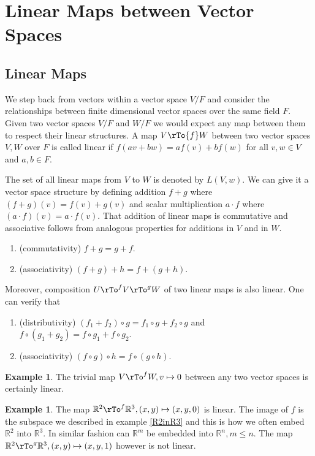 \documentclass[12pt]{amsart}
\theoremstyle{definition}
\newtheorem{example}[theorem]{Example}
\begin{document}
\section{Linear Maps between Vector Spaces}

\subsection {Linear Maps}\label{linearmapmatrix} We step back from vectors within a vector space $V/F$ and consider the relationships between finite dimensional vector spaces over the same field $F$. Given two vector spaces $V/F$ and $W/F$ we would expect any map between them to respect their linear structures.
\dfn A map $V \rTo{f} W$ between two vector spaces $V, W$ over $F$ is called linear if $f(a v + b w) = a f(v) + b f(w)$ for all $v, w \in V$ and $a, b \in F$.

The set of all linear maps from $V$ to $W$ is denoted by $L(V, w)$. We can give it a vector space structure by defining addition $f+g$ where $(f+g)(v) = f(v) + g(v)$ and scalar multiplication $a \cdot f$ where $(a \cdot f)(v) = a \cdot f(v)$. That addition of linear maps is commutative and associative follows from analogous properties for additions in $V$ and in $W$.
\begin{enumerate}[\indent 1.]
\item (commutativity) $f + g = g + f$.
\item (associativity) $(f + g) + h = f + (g + h)$.
\end{enumerate}

Moreover, composition $U \rTo^f V \rTo^g W$ of two linear maps is also linear. One can verify that
\begin{enumerate}[\indent 1.]
\item (distributivity) $(f_1 + f_2) \circ g = f_1 \circ g + f_2 \circ g$ and $f \circ (g_1 + g_2) = f \circ g_1 + f \circ g_2$.
\item (associativity) $(f \circ g) \circ h = f \circ (g \circ h)$.
\end{enumerate}

\begin{example} The trivial map $V \rTo^f W, v \mapsto 0$ between any two vector spaces is certainly linear.
\end{example}

\begin{example} The map $\mathbb{R}^2 \rTo^f \mathbb{R}^3, (x, y) \mapsto (x, y,0)$ is linear. The image of $f$ is the subspace we described in example \ref{R2inR3} and this is how we often embed $\mathbb{R}^2$ into $\mathbb{R}^3$. In similar fashion can $\mathbb{R}^m$ be embedded into $\mathbb{R}^n, m \leq n$. The map $\mathbb{R}^2 \rTo^g \mathbb{R}^3, (x, y) \mapsto (x, y,1)$ however is not linear.
\end{example}
\end{document}
